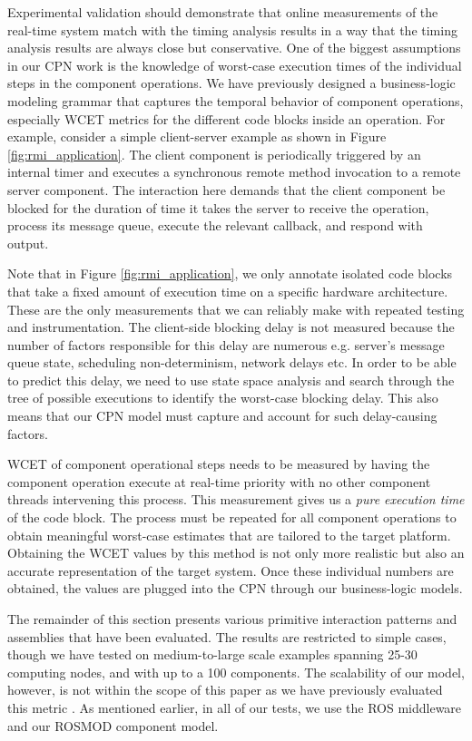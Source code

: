 Experimental validation should demonstrate that online measurements of the real-time system match with the timing analysis results in a way that the timing analysis results are always close but conservative. One of the biggest assumptions in our CPN work is the knowledge of worst-case execution times of the individual steps in the component operations. We have previously designed \cite{SEUS} a business-logic modeling grammar that captures the temporal behavior of component operations, especially WCET metrics for the different code blocks inside an operation. For example, consider a simple client-server example as shown in Figure \ref{fig:rmi_application}. The client component is periodically triggered by an internal timer and executes a synchronous remote method invocation to a remote server component. The interaction here demands that the client component be blocked for the duration of time it takes the server to receive the operation, process its message queue, execute the relevant callback, and respond with output. 

Note that in Figure \ref{fig:rmi_application}, we only annotate isolated code blocks that take a fixed amount of execution time on a specific hardware architecture. These are the only measurements that we can reliably make with repeated testing and instrumentation. The client-side blocking delay is not measured because the number of factors responsible for this delay are numerous e.g. server's message queue state, scheduling non-determinism, network delays etc. In order to be able to predict this delay, we need to use state space analysis and search through the tree of possible executions to identify the worst-case blocking delay. This also means that our CPN model must capture and account for such delay-causing factors. 

WCET of component operational steps needs to be measured by having the component operation execute at real-time priority with no other component threads intervening this process. This measurement gives us a \emph{pure execution time} of the code block. The process must be repeated for all component operations to obtain meaningful worst-case estimates that are tailored to the target platform. Obtaining the WCET values by this method is not only more realistic but also an accurate representation of the target system. Once these individual numbers are obtained, the values are plugged into the CPN through our business-logic models. 

The remainder of this section presents various primitive interaction patterns and assemblies that have been evaluated. The results are restricted to simple cases, though we have tested on medium-to-large scale examples spanning 25-30 computing nodes, and with up to a 100 components. The scalability of our model, however, is not within the scope of this paper as we have previously evaluated this metric \cite{SEUS}. As mentioned earlier, in all of our tests, we use the ROS \cite{ROS} middleware and our ROSMOD \cite{kumarROSMOD} component model. 

